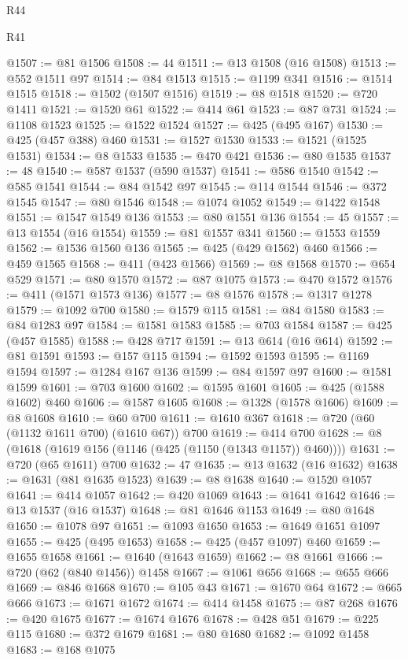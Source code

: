 \begin{lexlean}{R44}
\begin{lexlean}{R41}
\begin{coremodule}
{{{{{{{{{{{{{{{{{{{{{{{{{{{{{{{{{{{{{{{{{{{{{{{{{{{{{{{{{{{{{{{{{{{{{{{{{{{{{{{{{{{{{{{@1507 := @81 @1506
@1508 := 44
@1511 := @13 @1508 (@16 @1508)
@1513 := @552 @1511 @97
@1514 := @84 @1513
@1515 := @1199 @341
@1516 := @1514 @1515
@1518 := @1502 (@1507 @1516)
@1519 := @8 @1518
@1520 := @720 @1411
@1521 := @1520 @61
@1522 := @414 @61
@1523 := @87 @731
@1524 := @1108 @1523
@1525 := @1522 @1524
@1527 := @425 (@495 @167)
@1530 := @425 (@457 @388) @460
@1531 := @1527 @1530
@1533 := @1521 (@1525 @1531)
@1534 := @8 @1533
@1535 := @470 @421
@1536 := @80 @1535
@1537 := 48
@1540 := @587 @1537 (@590 @1537)
@1541 := @586 @1540
@1542 := @585 @1541
@1544 := @84 @1542 @97
@1545 := @114 @1544
@1546 := @372 @1545
@1547 := @80 @1546
@1548 := @1074 @1052
@1549 := @1422 @1548
@1551 := @1547 @1549 @136
@1553 := @80 @1551 @136
@1554 := 45
@1557 := @13 @1554 (@16 @1554)
@1559 := @81 @1557 @341
@1560 := @1553 @1559
@1562 := @1536 @1560 @136
@1565 := @425 (@429 @1562) @460
@1566 := @459 @1565
@1568 := @411 (@423 @1566)
@1569 := @8 @1568
@1570 := @654 @529
@1571 := @80 @1570
@1572 := @87 @1075
@1573 := @470 @1572
@1576 := @411 (@1571 @1573 @136)
@1577 := @8 @1576
@1578 := @1317 @1278
@1579 := @1092 @700
@1580 := @1579 @115
@1581 := @84 @1580
@1583 := @84 @1283 @97
@1584 := @1581 @1583
@1585 := @703 @1584
@1587 := @425 (@457 @1585)
@1588 := @428 @717
@1591 := @13 @614 (@16 @614)
@1592 := @81 @1591
@1593 := @157 @115
@1594 := @1592 @1593
@1595 := @1169 @1594
@1597 := @1284 @167 @136
@1599 := @84 @1597 @97
@1600 := @1581 @1599
@1601 := @703 @1600
@1602 := @1595 @1601
@1605 := @425 (@1588 @1602) @460
@1606 := @1587 @1605
@1608 := @1328 (@1578 @1606)
@1609 := @8 @1608
@1610 := @60 @700
@1611 := @1610 @367
@1618 := @720 (@60 (@1132 @1611 @700) (@1610 @67)) @700
@1619 := @414 @700
@1628 := @8 (@1618 (@1619 @156 (@1146 (@425 (@1150 (@1343 @1157)) @460))))
@1631 := @720 (@65 @1611) @700
@1632 := 47
@1635 := @13 @1632 (@16 @1632)
@1638 := @1631 (@81 @1635 @1523)
@1639 := @8 @1638
@1640 := @1520 @1057
@1641 := @414 @1057
@1642 := @420 @1069
@1643 := @1641 @1642
@1646 := @13 @1537 (@16 @1537)
@1648 := @81 @1646 @1153
@1649 := @80 @1648
@1650 := @1078 @97
@1651 := @1093 @1650
@1653 := @1649 @1651 @1097
@1655 := @425 (@495 @1653)
@1658 := @425 (@457 @1097) @460
@1659 := @1655 @1658
@1661 := @1640 (@1643 @1659)
@1662 := @8 @1661
@1666 := @720 (@62 (@840 @1456)) @1458
@1667 := @1061 @656
@1668 := @655 @666
@1669 := @846 @1668
@1670 := @105 @43
@1671 := @1670 @64
@1672 := @665 @666
@1673 := @1671 @1672
@1674 := @414 @1458
@1675 := @87 @268
@1676 := @420 @1675
@1677 := @1674 @1676
@1678 := @428 @51
@1679 := @225 @115
@1680 := @372 @1679
@1681 := @80 @1680
@1682 := @1092 @1458
@1683 := @168 @1075
}}}}}}}}}}}}}}}}}}}}}}}}}}}}}}}}}}}}}}}}}}}}}}}}}}}}}}}}}}}}}}}}}}}}}}}}}}}}}}}}}}}}}}}
\end{coremodule}
\end{lexlean}
\end{lexlean}

